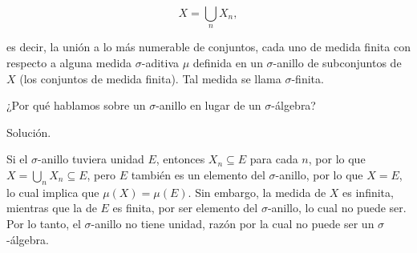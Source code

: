 \documentclass[fleqn]{article}
\begin{document}
	\begin{equation*}
		X = \bigcup_{n} X_n,
	\end{equation*}

	es decir, la unión a lo más numerable de conjuntos, cada uno de medida finita con respecto a alguna medida $\sigma$-aditiva $\mu$ definida en un $\sigma$-anillo de subconjuntos de $X$ (los conjuntos de medida finita). Tal medida se llama $\sigma$-finita. 

	¿Por qué hablamos sobre un $\sigma$-anillo en lugar de un $\sigma$-álgebra?

	Solución.
	
	Si el $\sigma$-anillo tuviera unidad $E$, entonces $ X_n \subseteq E $ para cada $n$, por lo que $ X = \displaystyle \bigcup_{n} X_n \subseteq E $, pero $E$ también es un elemento del $\sigma$-anillo, por lo que $ X = E $, lo cual implica que $ \mu(X) = \mu(E) $. Sin embargo, la medida de $X$ es infinita, mientras que la de $E$ es finita, por ser elemento del $\sigma$-anillo, lo cual no puede ser. Por lo tanto, el $\sigma$-anillo no tiene unidad, razón por la cual no puede ser un $\sigma$-álgebra.
\end{document}
